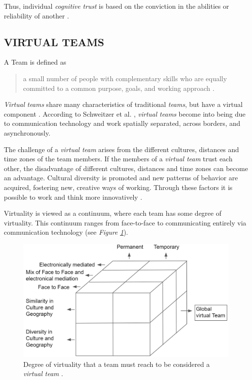 \documentclass[sigchi]{acmart}
\begin{document}
Thus, individual \textit{cognitive trust} is based on the conviction in the abilities or reliability of another \citep[p. 30]{mcallister1995affect}.

\subsection{VIRTUAL TEAMS}
A Team is defined as \begin{quote}\grqq{}a small number of people with complementary skills who are equally committed to a common purpose, goals, and working approach\grqq{} \citep[p. 2]{zenun2007effects}. \end{quote}

\textit{Virtual teams} share many characteristics of traditional \textit{teams}, but have a virtual component \citep[p. 270]{schweitzer2010conceptualizing}.
According to Schweitzer et al. \citep[p. 270]{schweitzer2010conceptualizing}, \textit{virtual teams} become into being due to communication technology and work spatially separated, across borders, and asynchronously.

The challenge of a \textit{virtual team} arises from the different cultures, distances and time zones of the team members. If the members of a \textit{virtual team} trust each other, the disadvantage of different cultures, distances and time zones can become an advantage. Cultural diversity is promoted and new patterns of behavior are acquired, fostering new, creative ways of working. Through these factors it is possible to work and think more innovatively \citep{dyer1995team} \citep[p. 405-416]{milliken1996searching}.

Virtuality is viewed as a continuum, where each team has some degree of virtuality. This continuum ranges from face-to-face to communicating entirely via communication technology \citep{martins2004virtual} (see \textit{Figure \ref{virtualTeamsVirtuality}}).

\begin{figure}[h]
  \centering
 	\includegraphics[width=\linewidth]{Abbildungen/Global-Virtual-Team.jpg}	
			\caption[Virtuality of a virtual team]{Degree of virtuality that a team must reach to be considered a \textit{virtual team} \citep{jarvenpaa1999communication}.}
			\label{virtualTeamsVirtuality}
\end{figure}
\end{document}

